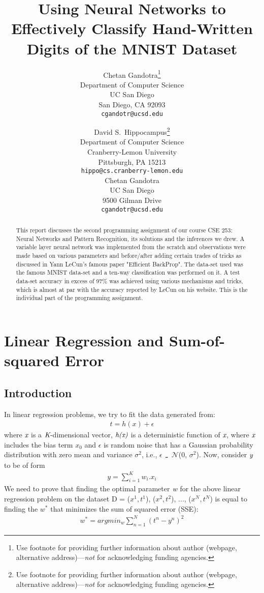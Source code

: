 \documentclass{article}
\title{Using Neural Networks to Effectively Classify Hand-Written Digits of the MNIST Dataset}
\author{
  Chetan Gandotra\thanks{Use footnote for providing further
    information about author (webpage, alternative
    address)---\emph{not} for acknowledging funding agencies.} \\
  Department of Computer Science\\
  UC San Diego\\
  San Diego, CA 92093 \\
  \texttt{cgandotr@ucsd.edu} \\
}
\author{
  David S.~Hippocampus\thanks{Use footnote for providing further
    information about author (webpage, alternative
    address)---\emph{not} for acknowledging funding agencies.} \\
  Department of Computer Science\\
  Cranberry-Lemon University\\
  Pittsburgh, PA 15213 \\
  \texttt{hippo@cs.cranberry-lemon.edu} \\
  Chetan Gandotra \\
  UC San Diego \\
  9500 Gilman Drive \\
  \texttt{cgandotr@ucsd.edu} \\
}
\newcommand\thicktilde{{\lower.74ex\hbox{\texttt{\char`\~}}}}
\begin{document}

\maketitle

\begin{abstract}
This report discusses the second programming assignment of our course CSE 253: Neural Networks and Pattern Recognition, its solutions and the inferences we drew. A variable layer neural network was implemented from the scratch and observations were made based on various parameters and before/after adding certain trades of tricks as discussed in Yann LeCun's famous paper "Efficient BackProp". The data-set used was the famous MNIST data-set and a ten-way classification was performed on it. A test data-set accuracy in excess of 97\% was achieved using various mechanisms and tricks, which is almost at par with the accuracy reported by LeCun on his website. This is the individual part of the programming assignment.
\end{abstract}

\section{Linear Regression and Sum-of-squared Error}
\subsection{Introduction}
In linear regression problems, we try to fit the data generated from:
\begin{align}
t = h(x) + \epsilon 
\end{align}
where $\emph{x}$ is a $\emph{K}$-dimensional vector, $\emph{h(x)}$ is a deterministic function of $\emph{x}$, where $\emph{x}$ includes the bias term $x_0$ and $\epsilon$ is random noise that has a Gaussian probability distribution with zero mean and variance $\sigma^2$, i.e., $\epsilon$ $\thicktilde$ $\mathcal{N}$(0, $\sigma^2$). Now, consider $\emph{y}$ to be of form 
\begin{align}
y = \sum_{i=1}^K w_i.x_i 
\end{align}
We need to prove that finding the optimal parameter $\emph{w}$ for the above linear regression problem on the dataset D = {($x^1, t^1$), ($x^2, t^2$), ..., ($x^N, t^N$)} is equal to finding the $w^*$ that minimizes the sum of squared error (SSE):
\begin{align}
w^* = argmin_w \sum_{n=1}^N(t^n - y^n)^2 
\end{align}
\end{document}
